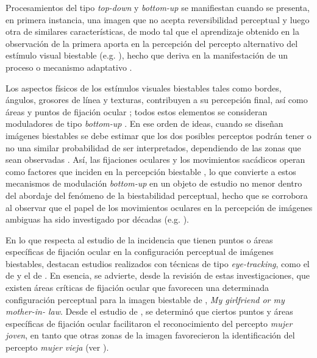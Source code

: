 \documentclass[spanish]{textolivre}
\begin{document}
Procesamientos del tipo \textit{top-down} y \textit{bottom-up} se manifiestan cuando se presenta, en primera instancia, una imagen que no acepta reversibilidad perceptual y luego otra de similares características, de modo tal que el aprendizaje obtenido en la observación de la primera aporta en la percepción del percepto alternativo del estímulo visual biestable (e.g. \cite{qiu_vaseface_2009}), hecho que deriva en la manifestación de un proceso o mecanismo adaptativo \cite{long_how_2007,long_configural_2002,long_prime_1992}.

Los aspectos físicos de los estímulos visuales biestables tales como bordes, ángulos, grosores de línea y texturas, contribuyen a su percepción final, así como áreas y puntos de fijación ocular \cite{meng_can_2004,rodriguez-martinez_ocular_2021}; todos estos elementos se consideran moduladores de tipo \textit{bottom-up} \cite{marroquin-ciendua_modulacion_2020,rodriguez-martinez_perceptual_2022}. En ese orden de ideas, cuando se diseñan imágenes biestables se debe estimar que los dos posibles perceptos podrán tener o no una similar probabilidad de ser interpretados, dependiendo de las zonas que sean observadas \cite{peters_components_2005}. Así, las fijaciones oculares y los movimientos sacádicos operan como factores que inciden en la percepción biestable \cite{marroquin-ciendua_modulacion_2020}, lo que convierte a estos mecanismos de modulación \textit{bottom-up} en un objeto de estudio no menor dentro del abordaje del fenómeno de la biestabilidad perceptual, hecho que se corrobora al observar que el papel de los movimientos oculares en la percepción de imágenes ambiguas ha sido investigado por décadas  (e.g. \textcite{flamm_reversible_1977,holcomb_selective_1977,ellis_eye_1978,groner_eye-movement_1983,van_dam_retinal_2006,marroquin-ciendua_modulacion_2020,rodriguez-martinez_ocular_2021}).

En lo que respecta al estudio de la incidencia que tienen puntos o áreas específicas de fijación ocular en la configuración perceptual de imágenes biestables, destacan estudios realizados con técnicas de tipo \textit{eye-tracking}, como el de \textcite{groner_eye-movement_1983} y el de \textcite{rodriguez-martinez_ocular_2021}. En esencia, se advierte, desde la revisión de estas investigaciones, que existen áreas críticas de fijación ocular que favorecen una determinada configuración perceptual para la imagen biestable de \textcite{boring_new_1930}, \textit{My girlfriend or my mother-in- law}. Desde el estudio de \textcite{groner_eye-movement_1983}, se determinó que ciertos puntos y áreas específicas de fijación ocular facilitaron el reconocimiento del percepto \textit{mujer joven}, en tanto que otras zonas de la imagen favorecieron la identificación del percepto \textit{mujer vieja} (ver ).
\end{document}

